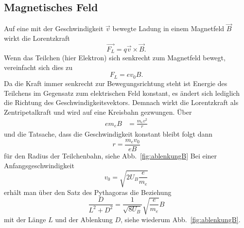 \subsection{Magnetisches Feld}
Auf eine mit der Geschwindigkeit $\vec v$ bewegte Ladung in einem Magnetfeld $\vec B$ wirkt die Lorentzkraft
\begin{equation}
  \vec {F_L} = q \vec v \times \vec B.
\end{equation}
Wenn das Teilchen (hier Elektron) sich senkrecht zum Magnetfeld bewegt, vereinfacht sich dies zu
\begin{equation}
  F_L = e v_0 B.
\end{equation}
Da die Kraft immer senkrecht zur Bewegungsrichtung steht ist Energie des Teilchens im Gegensatz zum elektrischen Feld konstant, es ändert sich lediglich die Richtung des Geschwindigkeitsvektors. Demnach wirkt die Lorentzkraft als Zentripetalkraft und wird auf eine Kreisbahn gezwungen. Über
\begin{align}
  e m_e B &= \frac{m_e v^2}{r}
\end{align}
und die Tatsache, dass die Geschwindigkeit konstant bleibt folgt dann
\begin{equation}
  r = \frac{m_e v_0}{e B}
\end{equation}
für den Radius der Teilchenbahn, siehe Abb.~\ref{fig:ablenkungB}
Bei einer Anfangsgeschwindigkeit
\begin{equation}
  v_0 = \sqrt{2 U_B \frac{e}{m_e}}
\end{equation}
erhält man über den Satz des Pythagoras die Beziehung
\begin{equation}
  \label{eqn:spez}
  \frac{D}{L^2 + D^2} = \frac{1}{\sqrt{8 U_B}} \sqrt{\frac{e}{m_e}} B
\end{equation}
mit der Länge $L$ und der Ablenkung $D$, siehe wiederum Abb.~\ref{fig:ablenkungB}.
